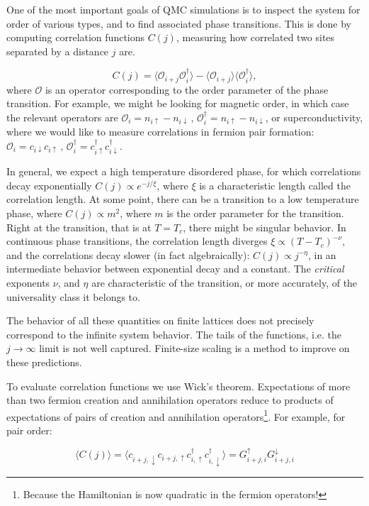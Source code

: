 \documentclass[10pt, twocolumn, twoside]{article}
\begin{document}
One of the most important goals of QMC simulations is to inspect the system for order of various types, and to find  associated phase transitions. This is done by computing correlation functions $C (j) $, measuring how correlated two sites separated by a distance $j$ are.

\begin{equation}
C(j) = \big\langle \mathcal{O}_{i+j} \mathcal{O}_{i}^\dagger \big\rangle - \langle \mathcal{O}_{i+j} \big\rangle\big\langle\mathcal{O}_{i}^\dagger \big\rangle ,
\end{equation}
where $\mathcal{O}$ is an operator corresponding to the order parameter of the phase transition. For example, we might be looking for magnetic order, in which case the relevant operators are $\mathcal{O}_i = n_{i\uparrow} - n_{i\downarrow} \, , \, \mathcal{O}_i^\dagger = n_{i\uparrow} - n_{i\downarrow}$, or superconductivity, where we would like to measure correlations in fermion pair formation: $\mathcal{O}_i = c_{i\downarrow} c_{i\uparrow} \, , \, \mathcal{O}_i^\dagger = c_{i\uparrow}^\dagger c_{i\downarrow}^\dagger$.

In general, we expect a high temperature disordered phase, for which correlations decay exponentially $C(j) \propto e^{-j/\xi}$, where $\xi$ is a characteristic length called the correlation length. At some point, there can be a transition to a low temperature phase, where $C(j) \propto m^2$, where $m$ is the order parameter for the transition. Right at the transition, that is at $T = T_c$, there might be singular behavior. In continuous phase transitions, the correlation length diverges $\xi \propto (T-T_c)^{-\nu}$, and the correlations decay slower (in fact algebraically): $C(j) \propto j^{-\eta}$, in an intermediate behavior between exponential decay and a constant. The \emph{critical} exponents $\nu$, and $\eta$ are characteristic of the transition, or more accurately, of the universality class it belongs to.

The behavior of all these quantities on finite lattices does not precisely correspond to the infinite system behavior. The tails of the functions, i.e. the $j\rightarrow \infty$ limit is not well captured. Finite-size scaling is a method to improve on these predictions.

To evaluate correlation functions we use Wick's theorem. Expectations of more than two fermion creation and annihilation operators reduce to products of expectations of pairs of creation and annihilation operators\footnote{Because the Hamiltonian is now quadratic in the fermion operators!}. For example, for pair order:

\begin{equation}
\big\langle C(j) \big\rangle = \big\langle c_{i+j, \downarrow} c_{i+j, \uparrow} c_{i, \uparrow}^\dagger c_{i, \downarrow}^\dagger \big\rangle = G_{i+j, i}^\uparrow G_{i+j, i}^\downarrow 
\end{equation}
\end{document}
